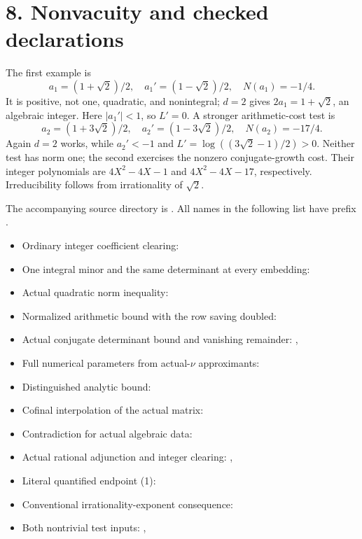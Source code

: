 \documentclass[11pt]{article}
\providecommand{\tightlist}{\setlength{\itemsep}{0pt}\setlength{\parskip}{0pt}}
\begin{document}
\section{8. Nonvacuity and checked
declarations}\label{nonvacuity-and-checked-declarations}

The first example is \[
a_1=(1+\sqrt2)/2,\quad a_1'=(1-\sqrt2)/2,\quad N(a_1)=-1/4.
\] It is positive, not one, quadratic, and nonintegral; \(d=2\) gives
\(2a_1=1+\sqrt2\), an algebraic integer. Here \(|a_1'|<1\), so \(L'=0\).
A stronger arithmetic-cost test is \[
a_2=(1+3\sqrt2)/2,\quad a_2'=(1-3\sqrt2)/2,\quad N(a_2)=-17/4.
\] Again \(d=2\) works, while \(a_2'<-1\) and
\(L'=\log((3\sqrt2-1)/2)>0\). Neither test has norm one; the second
exercises the nonzero conjugate-growth cost. Their integer polynomials
are \(4X^2-4X-1\) and \(4X^2-4X-17\), respectively. Irreducibility
follows from irrationality of \(\sqrt2\).

The accompanying source directory is . All
names in the following list have prefix .

\begin{itemize}
\tightlist
\item
  Ordinary integer coefficient clearing:
\item
  One integral minor and the same determinant at every embedding:
\item
  Actual quadratic norm inequality:
\item
  Normalized arithmetic bound with the row saving doubled:
\item
  Actual conjugate determinant bound and vanishing remainder:
  ,
\item
  Full numerical parameters from actual-\(\nu\) approximants:
\item
  Distinguished analytic bound:
\item
  Cofinal interpolation of the actual matrix:
\item
  Contradiction for actual algebraic data:
\item
  Actual rational adjunction and integer clearing:
  ,
\item
  Literal quantified endpoint (1): 
\item
  Conventional irrationality-exponent consequence:
\item
  Both nontrivial test inputs: ,
\end{itemize}
\end{document}
